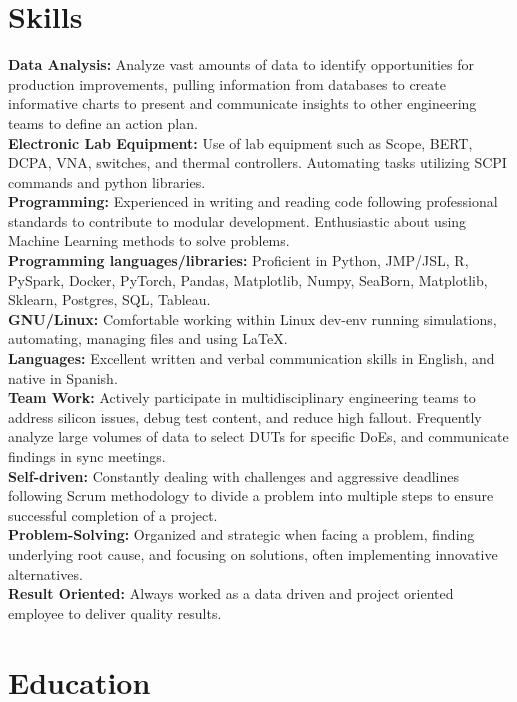 \documentclass{article}
\begin{document}
\section{Skills}
\noindent\textbf{Data Analysis:} Analyze vast amounts of data to identify opportunities for production improvements, pulling information from databases to create informative charts to present and communicate insights to other engineering teams to define an action plan.\\
\textbf{Electronic Lab Equipment:} Use of lab equipment such as Scope, BERT, DCPA, VNA, switches, and thermal controllers. Automating tasks utilizing SCPI commands and python libraries.\\
\textbf{Programming:} Experienced in writing and reading code following professional standards to contribute to modular development. Enthusiastic about using Machine Learning methods to solve problems.\\
\textbf{Programming languages/libraries:} Proficient in Python, JMP/JSL, R, PySpark, Docker, PyTorch, Pandas, Matplotlib, Numpy, SeaBorn, Matplotlib, Sklearn, Postgres, SQL, Tableau.\\
\textbf{GNU/Linux:} Comfortable working within Linux dev-env running simulations, automating, managing files and using \LaTeX .\\
\textbf{Languages:} Excellent written and verbal communication skills in English, and native in Spanish.\\
\textbf{Team Work:} Actively participate in multidisciplinary engineering teams to address silicon issues, debug test content, and reduce high fallout. Frequently analyze large volumes of data to select DUTs for specific DoEs, and communicate findings in sync meetings.\\
\textbf{Self-driven:} Constantly dealing with challenges and aggressive deadlines following Scrum methodology to divide a problem into multiple steps to ensure successful completion of a project.\\
\textbf{Problem-Solving:} Organized and strategic when facing a problem, finding underlying root cause, and focusing on solutions, often implementing innovative alternatives. \\
\textbf{Result Oriented:} Always worked as a data driven and project oriented employee to deliver quality results. 

\section{Education}
\end{document}
